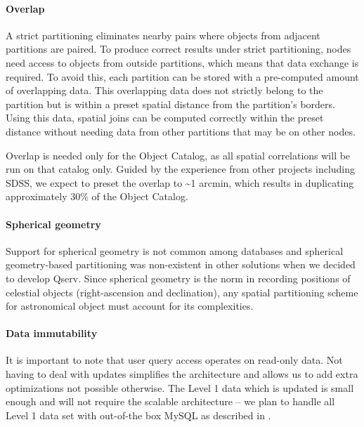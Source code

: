 \documentclass[DM,lsstdraft,toc]{lsstdoc}
\begin{document}
\paragraph{Overlap}\label{overlap}

A strict partitioning eliminates nearby pairs where objects from
adjacent partitions are paired. To produce correct results under strict
partitioning, nodes need access to objects from outside partitions,
which means that data exchange is required. To avoid this, each
partition can be stored with a pre-computed amount of overlapping data.
This overlapping data does not strictly belong to the partition but is
within a preset spatial distance from the partition's borders. Using
this data, spatial joins can be computed correctly within the preset
distance without needing data from other partitions that may be on other
nodes.

Overlap is needed only for the Object Catalog, as all spatial
correlations will be run on that catalog only. Guided by the experience
from other projects including SDSS, we expect to preset the overlap to
\textasciitilde{}1 arcmin, which results in duplicating approximately
30\% of the Object Catalog.

\paragraph{Spherical geometry}\label{spherical-geometry}

Support for spherical geometry is not common among databases and
spherical geometry-based partitioning was non-existent in other
solutions when we decided to develop Qserv. Since spherical geometry is
the norm in recording positions of celestial objects (right-ascension
and declination), any spatial partitioning scheme for astronomical
object must account for its complexities.

\paragraph{Data immutability}\label{data-immutability}

It is important to note that user query access operates on read-only
data. Not having to deal with updates simplifies the architecture and
allows us to add extra optimizations not possible otherwise. The Level 1
data which is updated is small enough and will not require the scalable
architecture -- we plan to handle all Level 1 data set with out-of-the
box MySQL as described in .
\end{document}
